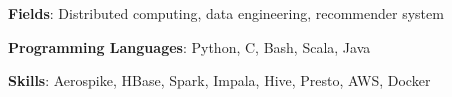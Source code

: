 

\begin{cventries}
    \cvsimpleentry
        { %
            \begin{cvitems}
                \item{
                    {\bf Fields}: Distributed computing, data engineering, recommender system \nn
                }
                \item{
                    {\bf Programming Languages}: Python, C, Bash, Scala, Java \nn
                }
                \item{
                    {\bf Skills}: Aerospike, HBase, Spark, Impala, Hive, Presto, AWS, Docker \nn
                }
            \end{cvitems}
        }
\end{cventries}
